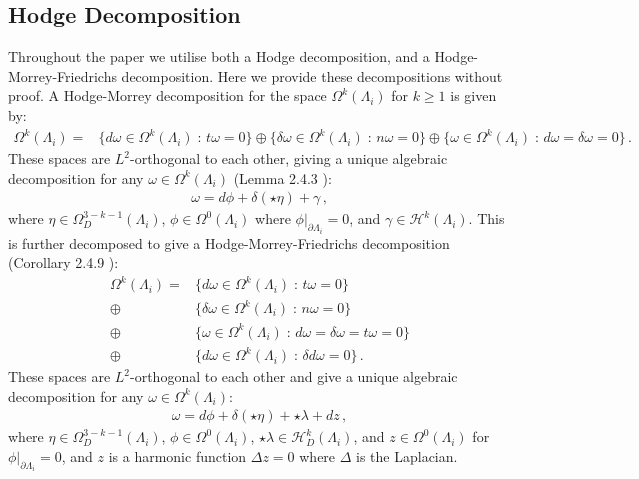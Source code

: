 \documentclass[11pt]{article}
\theoremstyle{plain}
\theoremstyle{definition}
\theoremstyle{remark}
\newcommand{\ST}{\Lambda}
\begin{document}
 
 




\subsection{Hodge Decomposition}\label{append:Hodge}

Throughout the paper we utilise both a Hodge decomposition, and a Hodge-Morrey-Friedrichs decomposition. Here we provide these decompositions without proof. A Hodge-Morrey decomposition for the space \( \Omega^k  (\ST_i)\) for \(k \geq 1\) is given by:
\begin{align*}
     \Omega^k  (\ST_i) = &  \{      d\omega \in  \Omega^k (\ST_i)  \; : \, t \omega = 0     \} %
     \oplus%
    \{      \delta \omega \in  \Omega^k (\ST_i)    \; : \, n \omega = 0       \} %
    \oplus 
     \{      \omega \in \Omega^k (\ST_i)   \; : \, d \omega = \delta \omega = 0       \} \, .
\end{align*}
These spaces are \(L^2\)-orthogonal to each other, giving a unique algebraic decomposition for any \(\omega \in  \Omega^k  (\ST_i)\) (Lemma 2.4.3 \cite{schwarz-1995}):
\begin{align*}
    \omega = d \phi + \delta (\star \eta) + \gamma  \, , %
\end{align*}
where \( \eta \in  \Omega_D^{3-k-1} (\ST_i) \), \(\phi \in  \Omega^0 (\ST_i)\) where \(\phi|_{\partial \ST_i} = 0\), and \(\gamma \in \mathcal{H}^k( \ST_i)\). This is further decomposed to give a Hodge-Morrey-Friedrichs decomposition (Corollary 2.4.9 \cite{schwarz-1995}):
\begin{align*}
     \Omega^k  (\ST_i) = &  \{      d\omega \in  \Omega^k (\ST_i)  \; : \, t \omega = 0   \} \\  \oplus &
    \{      \delta \omega \in  \Omega^k  (\ST_i)    \; : \, n \omega = 0   \} \\  \oplus &
    \{      \omega \in  \Omega^k  (\ST_i)   \; : \, d \omega = \delta \omega = t \omega= 0       \}\\ \oplus&
    \{      d \omega \in  \Omega^k  (\ST_i)   \; : \, \delta d \omega  = 0        \} \, .
\end{align*}
These spaces are \(L^2\)-orthogonal to each other and give a unique algebraic decomposition for any \(\omega \in  \Omega^k  (\ST_i)\):
\begin{align*}
    \omega = d \phi + \delta (\star \eta) + \star \lambda + dz  \, , 
\end{align*}
where \( \eta \in  \Omega_D^{3-k-1} (\ST_i) \), \(\phi \in  \Omega^0(\ST_i)\), \(\star \lambda \in \mathcal{H}^k_D (\ST_i)\), and \(z \in  \Omega^0 (\ST_i)\) for \(\phi|_{\partial \ST_i} = 0\), and \(z\) is a harmonic function \(\Delta z = 0\) where \(\Delta \) is the Laplacian.
\end{document}
